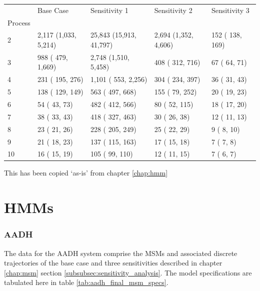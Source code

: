 \begin{table}
    \centering

    \begin{tabular}{|l|l|l|l|l|}
    \hline
     &             Base Case &            Sensitivity 1 &         Sensitivity 2 &      Sensitivity 3 \\
    Process &                       &                          &                       &                    \\
    \hline\hline
    2       &  2,117 (1,033, 5,214) &  25,843 (15,913, 41,797) &  2,694 (1,352, 4,606) &   152 ( 138,  169) \\
    3       &     988 ( 479, 1,669) &     2,748 (1,510, 5,458) &      408 ( 312,  716) &    67 (  64,   71) \\
    4       &      231 ( 195,  276) &      1,101 ( 553, 2,256) &      304 ( 234,  397) &    36 (  31,   43) \\
    5       &      138 ( 129,  149) &         563 ( 497,  668) &      155 (  79,  252) &    20 (  19,   23) \\
    6       &       54 (  43,   73) &         482 ( 412,  566) &       80 (  52,  115) &    18 (  17,   20) \\
    7       &       38 (  33,   43) &         418 ( 327,  463) &       30 (  26,   38) &    12 (  11,   13) \\
    8       &       23 (  21,   26) &         228 ( 205,  249) &       25 (  22,   29) &     9 (   8,   10) \\
    9       &       21 (  18,   23) &         137 ( 115,  163) &       17 (  15,   18) &     7 (   7,    8) \\
    10      &       16 (  15,   19) &         105 (  99,  110) &       12 (  11,   15) &     7 (   6,    7) \\
    \hline
    \end{tabular}
    \label{tab:sens_ts}
\end{table}

{\huge This has been copied `as-is' from chapter \ref{chap:hmm}}
\section{HMMs}
\subsubsection{AADH}
The data for the AADH system comprise the MSMs and associated discrete trajectories of the base case and three sensitivities described in chapter \ref{chap:msm} section \ref{subsubsec:sensitivity_analysis}. The model specifications are tabulated here in table \ref{tab:aadh_final_msm_specs}. 

